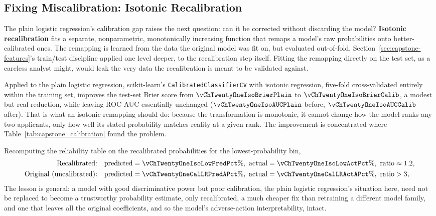 \documentclass[../ai_in_finance]{subfiles}
\begin{document}
\subsection{Fixing Miscalibration: Isotonic Recalibration}
\label{sec:capstone-isotonic}

The plain logistic regression's calibration gap raises the next question: can it be corrected without discarding the model? \textbf{Isotonic recalibration} fits a separate, nonparametric, monotonically increasing function that remaps a model's raw probabilities onto better-calibrated ones. The remapping is learned from the data the original model was fit on, but evaluated out-of-fold, Section~\ref{sec:capstone-features}'s train/test discipline applied one level deeper, to the recalibration step itself. Fitting the remapping directly on the test set, as a careless analyst might, would leak the very data the recalibration is meant to be validated against.

Applied to the plain logistic regression, scikit-learn's \texttt{CalibratedClassifierCV} with isotonic regression, five-fold cross-validated entirely within the training set, improves the test-set Brier score from $\vChTwentyOneIsoBrierPlain$ to $\vChTwentyOneIsoBrierCalib$, a modest but real reduction, while leaving ROC-AUC essentially unchanged ($\vChTwentyOneIsoAUCPlain$ before, $\vChTwentyOneIsoAUCCalib$ after). That is what an isotonic remapping should do: because the transformation is monotonic, it cannot change how the model ranks any two applicants, only how well its stated probability matches reality at a given rank. The improvement is concentrated where Table~\ref{tab:capstone_calibration} found the problem.

Recomputing the reliability table on the recalibrated probabilities for the lowest-probability bin,
\begin{align*}
\text{Recalibrated:} &\quad \text{predicted} = \vChTwentyOneIsoLowPredPct\%, \ \text{actual} = \vChTwentyOneIsoLowActPct\%, \ \text{ratio} \approx 1.2, \\
\text{Original (uncalibrated):} &\quad \text{predicted} = \vChTwentyOneCalLRPredAPct\%, \ \text{actual} = \vChTwentyOneCalLRActAPct\%, \ \text{ratio} > 3,
\end{align*} The lesson is general: a model with good discriminative power but poor calibration, the plain logistic regression's situation here, need not be replaced to become a trustworthy probability estimate, only recalibrated, a much cheaper fix than retraining a different model family, and one that leaves all the original coefficients, and so the model's adverse-action interpretability, intact.
\end{document}
